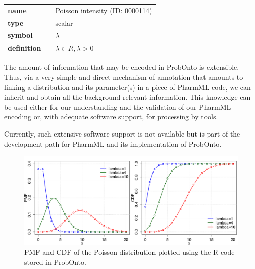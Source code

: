 {\noindent\begin{tabular}{p{2cm}cl}
\textbf{name} & & Poisson intensity  (ID: 0000114) \\
\textbf{type} & & scalar \\
\textbf{symbol} & & $\lambda$  \\
\textbf{definition} & & $\lambda \in R, \lambda > 0$
\end{tabular}
\bigskip 

The amount of information that may be encoded in ProbOnto is extensible. 
Thus,  via a very simple and direct mechanism of annotation that amounts to 
linking a distribution and its parameter(s) in a piece of PharmML code, we can
 inherit and obtain all the background relevant information. 
 This knowledge can be used either for our understanding and the validation of 
 our PharmML encoding or, with adequate software support, for processing by 
 tools. 
 
Currently, such extensive software support is not available but is part of the 
development path for PharmML and its implementation of ProbOnto. 

\begin{figure}[htb!]
\centering
  \includegraphics[width=120mm]{pics/Poisson_pmf_cdf.pdf}
 \caption{PMF and CDF of the Poisson distribution plotted using the R-code
 stored in ProbOnto.}
 \label{fig:PoissonExample}
\end{figure}

}
